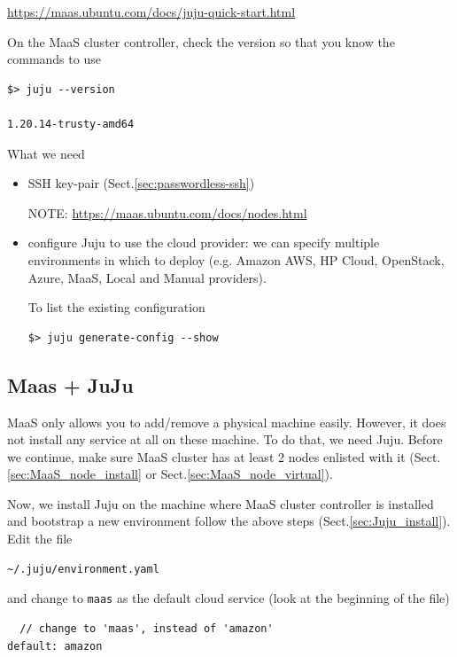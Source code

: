 \url{https://maas.ubuntu.com/docs/juju-quick-start.html}

On the MaaS cluster controller, check the version so that you know the commands
to use
\begin{verbatim}
$> juju --version

1.20.14-trusty-amd64
\end{verbatim}

What we need
\begin{itemize}
  \item SSH key-pair (Sect.\ref{sec:passwordless-ssh})
  
NOTE: \url{https://maas.ubuntu.com/docs/nodes.html} 
  
  \item configure Juju to use the cloud provider: we can specify multiple
  environments in which to deploy (e.g. Amazon AWS, HP Cloud, OpenStack, Azure,
  MaaS, Local and Manual providers).
  
  
To list the existing configuration
\begin{verbatim}
$> juju generate-config --show
\end{verbatim}
\end{itemize}


\subsection{Maas + JuJu}
\label{sec:MaaS_Juju}

MaaS only allows you to add/remove a physical machine easily. However, it does
not install any service at all on these machine. To do that, we need Juju.
Before we continue, make sure MaaS cluster has at least 2 nodes enlisted with
it (Sect.\ref{sec:MaaS_node_install} or Sect.\ref{sec:MaaS_node_virtual}). 

Now, we install Juju on the machine where MaaS cluster controller is installed
and bootstrap a new environment follow the above steps
(Sect.\ref{sec:Juju_install}). Edit the file
\begin{verbatim}
~/.juju/environment.yaml
\end{verbatim}

and change to \verb!maas! as the default cloud service (look at the
beginning of the file)
\begin{verbatim}
  // change to 'maas', instead of 'amazon'
default: amazon 
\end{verbatim}


